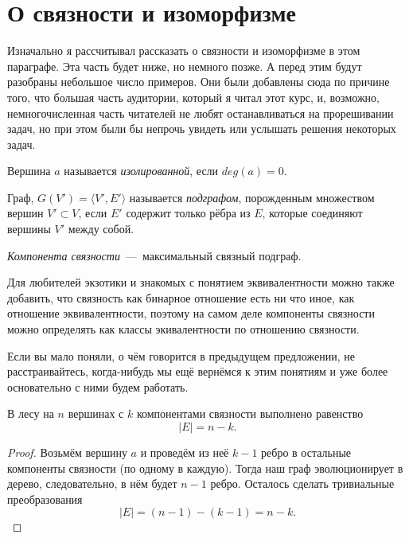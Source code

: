 \section{О связности и изоморфизме}

	Изначально я рассчитывал рассказать о связности и изоморфизме в этом параграфе. Эта часть будет ниже, но немного позже. А перед этим будут разобраны небольшое число примеров. Они были добавлены сюда по причине того, что большая часть аудитории, который я читал этот курс, и, возможно, немногочисленная часть читателей не любят останавливаться на прорешивании задач, но при этом были бы непрочь увидеть или услышать решения некоторых задач.


\begin{definition}
	Вершина $a$ называется \emph{изолированной}, если $deg(a) = 0$.
\end{definition}

\begin{definition}
	Граф, $G(V') = \langle V', E' \rangle$ называется \emph{подграфом}, порожденным множеством вершин $V' \subset V$, если $E'$ содержит только рёбра из $E$, которые соединяют вершины $V'$ между собой.
\end{definition}

\begin{definition}
	\emph{Компонента связности}~---~максимальный связный подграф.
\end{definition}

	Для любителей экзотики и знакомых с понятием эквивалентности можно также добавить, что связность как бинарное отношение есть ни что иное, как отношение эквивалентности, поэтому на самом деле компоненты связности можно определять как классы экивалентности по отношению связности.
	
	Если вы мало поняли, о чём говорится в предыдущем предложении, не расстраивайтесь, когда-нибудь мы ещё вернёмся к этим понятиям и уже более основательно с ними будем работать. 

\begin{statement}
	В лесу на $n$ вершинах с $k$ компонентами связности выполнено равенство
	$$|E| = n - k.$$
	
\begin{proof}
	Возьмём вершину $a$ и проведём из неё $k-1$ ребро в остальные компоненты связности (по одному в каждую). Тогда наш граф эволюционирует в дерево, следовательно, в нём будет $n-1$ ребро. Осталось сделать тривиальные преобразования
	$$|E| = (n-1) - (k-1) = n-k.$$
\end{proof}
\end{statement}
	
